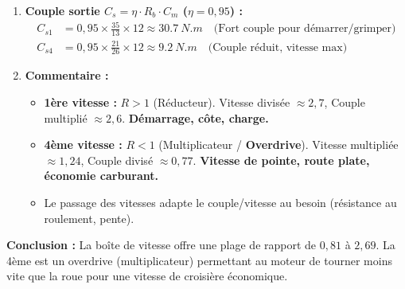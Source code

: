 \documentclass[11pt]{article}
\begin{document}
\begin{exoresolu}
\begin{enumerate}
\begin{align*}
                  N_{s4} &= \frac{8000}{21/26} = 8000 \times \frac{26}{21} \approx \SI{9905}{tr/min}
              \end{align*}
        \item \textbf{Couple sortie $C_s = \eta \cdot R_b \cdot C_m$ ($\eta=0,95$) :}
              \begin{align*}
                  C_{s1} &= 0,95 \times \frac{35}{13} \times 12 \approx \SI{30,7}{N.m} \quad \text{(Fort couple pour démarrer/grimper)} \\
                  C_{s4} &= 0,95 \times \frac{21}{26} \times 12 \approx \SI{9,2}{N.m} \quad \text{(Couple réduit, vitesse max)}
              \end{align*}
        \item \textbf{Commentaire :}
              \begin{itemize}
                  \item \textbf{1ère vitesse :} $R > 1$ (Réducteur). Vitesse divisée $\approx 2,7$, Couple multiplié $\approx 2,6$. \textbf{Démarrage, côte, charge.}
                  \item \textbf{4ème vitesse :} $R < 1$ (Multiplicateur / \textbf{Overdrive}). Vitesse multipliée $\approx 1,24$, Couple divisé $\approx 0,77$. \textbf{Vitesse de pointe, route plate, économie carburant.}
                  \item Le passage des vitesses adapte le couple/vitesse au besoin (résistance au roulement, pente).
              \end{itemize}
    \end{enumerate}
    \textbf{Conclusion :} La boîte de vitesse offre une plage de rapport de $0,81$ à $2,69$. La 4ème est un overdrive (multiplicateur) permettant au moteur de tourner moins vite que la roue pour une vitesse de croisière économique.
\end{exoresolu}
\end{document}
